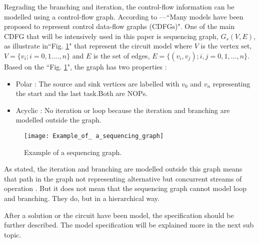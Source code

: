 Regrading the branching and iteration, the control-flow information can be modelled using a control-flow graph. According to \cite{main}---``Many models have been proposed to represent control data-flow graphs (CDFGs)". One of the main CDFG that will be intensively used in this paper is sequencing graph,  $G_{s}(V, E)$, as illustrate in``Fig. \ref{Example_of_ a_sequencing_graph}" that represent the circuit model where $V$ is the vertex set, $ V = \{v_{i}; i = 0, 1.. . . , n\}$ and $E$ is the set of edges, $ E = \{(v_{i}, v_{j}); i, j = 0, 1, ... , n\} $. 
Based on the ``Fig. \ref{Example_of_ a_sequencing_graph}", the graph has two properties :

\begin{itemize}
    \item Polar : The source and sink vertices are labelled with $v_{0}$ and $v_{n}$ representing the start and the last task.Both are NOPs.
    \item Acyclic : No iteration or loop because the iteration and branching are modelled outside the graph.
\end{itemize}

\begin{figure}[ht]
    \centering
    \texttt{[image: Example\_of\_ a\_sequencing\_graph]}
    \caption{Example of a sequencing graph. \cite{main}}
    \label{Example_of_ a_sequencing_graph}
\end{figure}



As stated, the iteration and branching are modelled outside this graph means that path in the graph not representing alternative but concurrent streams of operation \cite{main}. But it does not mean that the sequencing graph cannot model loop and branching. They do, but in a hierarchical way.


After a solution or the circuit have been model, the specification should be further described. The model specification will be explained more in the next sub topic.